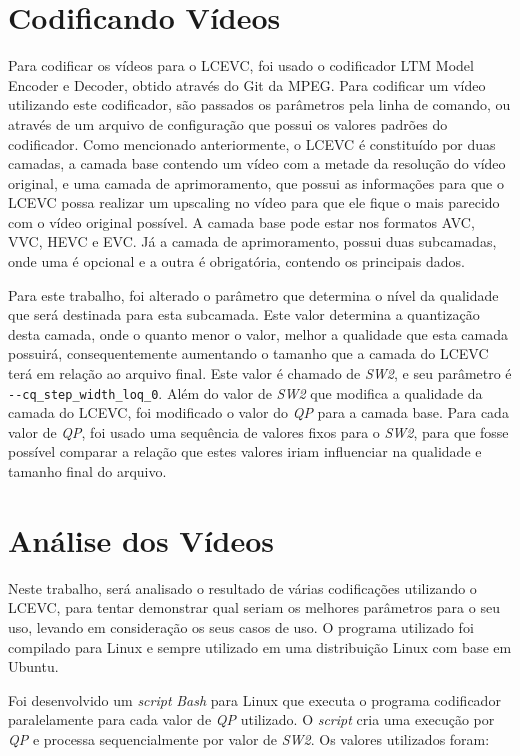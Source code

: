 \section{Codificando Vídeos}

Para codificar os vídeos para o \acrshort{LCEVC}, foi usado o codificador
LTM Model Encoder e Decoder, obtido através do Git da MPEG. Para codificar um vídeo utilizando
este codificador, são passados os parâmetros pela linha de comando, ou
através de um arquivo de configuração que possui os valores padrões do
codificador. Como mencionado anteriormente, o \acrshort{LCEVC} é constituído por
duas camadas, a camada base contendo um vídeo com a metade da resolução
do vídeo original, e uma camada de aprimoramento, que possui as informações
para que o \acrshort{LCEVC} possa realizar um upscaling no vídeo para que ele fique
o mais parecido com o vídeo original possível. A camada base pode estar
nos formatos AVC, VVC, HEVC e EVC. Já a camada de aprimoramento, possui
duas subcamadas, onde uma é opcional e a outra é obrigatória, contendo
os principais dados.

Para este trabalho, foi alterado o parâmetro que determina
o nível da qualidade que será destinada para esta subcamada. Este
valor determina a quantização desta camada, onde o quanto menor o valor,
melhor a qualidade que esta camada possuirá, consequentemente aumentando
o tamanho que a camada do \acrshort{LCEVC} terá em relação ao arquivo final. Este
valor é chamado de \textit{SW2}, e seu parâmetro é 
\texttt{-{}-cq\_step\_width\_loq\_0}. Além do valor de \textit{SW2} que
modifica a qualidade da camada do \acrshort{LCEVC}, foi modificado o valor do \textit{QP}
para a camada base. Para cada valor de \textit{QP}, foi usado uma sequência 
de valores fixos para o \textit{SW2}, para que fosse possível comparar a
relação que estes valores iriam influenciar na qualidade e tamanho final
do arquivo.
 
\section{Análise dos Vídeos}

Neste trabalho, será analisado o resultado de várias codificações utilizando o
\acrshort{LCEVC}, para tentar demonstrar qual seriam os melhores parâmetros para o seu uso,
levando em consideração os seus casos de uso. O programa utilizado foi compilado
para Linux e sempre utilizado em uma distribuição Linux com base em Ubuntu.

Foi desenvolvido um \textit{script} \textit{Bash} para Linux \cite{my_scripts} que executa o programa codificador
paralelamente para cada valor de \textit{QP} utilizado. O \textit{script} cria uma execução por
\textit{QP} e processa sequencialmente por valor de \textit{SW2}. Os valores utilizados
foram:

